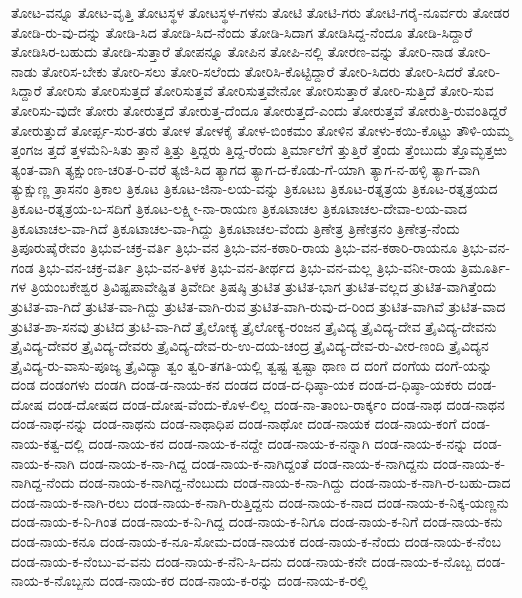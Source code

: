 ತೋಟ-ವನ್ನೂ
ತೋಟ-ವೃತ್ತಿ
ತೋಟಸ್ಥಳ
ತೋಟಸ್ಥಳ-ಗಳನು
ತೋಟಿ
ತೋಟಿ-ಗರು
ತೋಟಿ-ಗರೈ-ನೂರ್ವರು
ತೋಡರ
ತೋಡಿ-ರು-ವು-ದನ್ನು
ತೋಡಿ-ಸಿದ
ತೋಡಿ-ಸಿದ-ನೆಂದು
ತೋಡಿ-ಸಿದಾಗ
ತೋಡಿಸಿದ್ದ-ನೆಂದೂ
ತೋಡಿ-ಸಿದ್ದಾರೆ
ತೋಡಿಸಿರ-ಬಹುದು
ತೋಡಿ-ಸುತ್ತಾರೆ
ತೋಪನ್ನೂ
ತೋಪಿನ
ತೋಪಿ-ನಲ್ಲಿ
ತೋರಣ-ವನ್ನು
ತೋರಿ-ನಾಡ
ತೋರಿ-ನಾಡು
ತೋರಿಸ-ಬೇಕು
ತೋರಿ-ಸಲು
ತೋರಿ-ಸಲೆಂದು
ತೋರಿಸಿ-ಕೊಟ್ಟಿದ್ದಾರೆ
ತೋರಿ-ಸಿದರು
ತೋರಿ-ಸಿದರೆ
ತೋರಿ-ಸಿದ್ದಾರೆ
ತೋರಿಸು
ತೋರಿಸುತ್ತದೆ
ತೋರಿಸುತ್ತವೆ
ತೋರಿಸುತ್ತವೇನೋ
ತೋರಿಸುತ್ತಾರೆ
ತೋರಿ-ಸುತ್ತಿದೆ
ತೋರಿ-ಸುವ
ತೋರಿಸು-ವುದೇ
ತೋರು
ತೋರುತ್ತದೆ
ತೋರುತ್ತ-ದೆಂದೂ
ತೋರುತ್ತದೆ-ಎಂದು
ತೋರುತ್ತವೆ
ತೋರುತ್ತಿ-ರುವಂತಿದ್ದರೆ
ತೋರುತ್ತುದೆ
ತೋರ್ಪ್ಪ-ಸುರ-ತರು
ತೋಳ
ತೋಳಕೈ
ತೋಳ-ಬಿಂಕಮಂ
ತೋಳಿನ
ತೋಳು-ಕಯಿ-ಕೊಟ್ಟು
ತೌಳಿ-ಯಮ್ಮ
ತ್ತಂಗಜ
ತ್ತದೆ
ತ್ತಳಮೆನಿ-ಸಿತು
ತ್ತಾನೆ
ತ್ತಿತ್ತು
ತ್ತಿದ್ದರು
ತ್ತಿದ್ದ-ರೆಂದು
ತ್ತಿರ್ಮಾಲೆಗೆ
ತ್ತುತ್ತಿರೆ
ತ್ತೆಂದು
ತ್ತೆಂಬುದು
ತ್ತೊಮ್ಭತ್ತಱು
ತ್ಯಂತ-ವಾಗಿ
ತ್ಯಕ್ಷುಂಣ-ಚರಿತ-ರಿ-ವರೆ
ತ್ಯಜಿ-ಸಿದ
ತ್ಯಾಗದ
ತ್ಯಾಗ-ದ-ಕೊಡು-ಗೆ-ಯಾಗಿ
ತ್ಯಾಗ-ನ-ಹಳ್ಳಿ
ತ್ಯಾಗ-ವಾಗಿ
ತ್ಯುಕ್ಷುಣ್ಣ
ತ್ರಾಸನಂ
ತ್ರಿಕಾಲ
ತ್ರಿಕೂಟ
ತ್ರಿಕೂಟ-ಜಿನಾ-ಲಯ-ವನ್ನು
ತ್ರಿಕೂಟಬ
ತ್ರಿಕೂಟ-ರತ್ನತ್ರಯ
ತ್ರಿಕೂಟ-ರತ್ನತ್ರಯದ
ತ್ರಿಕೂಟ-ರತ್ನತ್ರಯ-ಬ-ಸದಿಗೆ
ತ್ರಿಕೂಟ-ಲಕ್ಷ್ಮೀ-ನಾ-ರಾಯಣ
ತ್ರಿಕೂಟಾಚಲ
ತ್ರಿಕೂಟಾಚಲ-ದೇವಾ-ಲಯ-ವಾದ
ತ್ರಿಕೂಟಾಚಲ-ವಾ-ಗಿದೆ
ತ್ರಿಕೂಟಾಚಲ-ವಾ-ಗಿದ್ದು
ತ್ರಿಕೂಟಾಚಲ-ವೆಂದು
ತ್ರಿಣೇತ್ರ
ತ್ರಿಣೇತ್ರನಂ
ತ್ರಿಣೇತ್ರ-ನೆಂದು
ತ್ರಿಪೂರುಷೈರೇವಂ
ತ್ರಿಭುವ-ಚಕ್ರ-ವರ್ತಿ
ತ್ರಿಭು-ವನ
ತ್ರಿಭು-ವನ-ಕಠಾರಿ-ರಾಯ
ತ್ರಿಭು-ವನ-ಕಠಾರಿ-ರಾಯನೂ
ತ್ರಿಭು-ವನ-ಗಂಡ
ತ್ರಿಭು-ವನ-ಚಕ್ರ-ವರ್ತಿ
ತ್ರಿಭು-ವನ-ತಿಳಕ
ತ್ರಿಭು-ವನ-ತೀರ್ಥದ
ತ್ರಿಭು-ವನ-ಮಲ್ಲ
ತ್ರಿಭು-ವನೀ-ರಾಯ
ತ್ರಿಮೂರ್ತಿ-ಗಳ
ತ್ರಿಯಂಬಕೇಶ್ವರ
ತ್ರಿವಿಷ್ಟಪಾವೇಷ್ಟಿತ
ತ್ರಿವೇದೀ
ತ್ರಿಷಷ್ಠಿ
ತ್ರುಟಿತ
ತ್ರುಟಿತ-ಭಾಗ
ತ್ರುಟಿತ-ವಲ್ಲದ
ತ್ರುಟಿತ-ವಾಗಿತ್ತೆಂದು
ತ್ರುಟಿತ-ವಾ-ಗಿದೆ
ತ್ರುಟಿತ-ವಾ-ಗಿದ್ದು
ತ್ರುಟಿತ-ವಾಗಿ-ರುವ
ತ್ರುಟಿತ-ವಾಗಿ-ರುವು-ದ-ರಿಂದ
ತ್ರುಟಿತ-ವಾಗಿವೆ
ತ್ರುಟಿತ-ವಾದ
ತ್ರುಟಿತ-ಶಾ-ಸನವು
ತ್ರುಟಿದ
ತ್ರುಟಿ-ವಾ-ಗಿದೆ
ತ್ರೈಲೋಕ್ಯ
ತ್ರೈಲೋಕ್ಯ-ರಂಜನ
ತ್ರೈವಿದ್ಯ
ತ್ರೈವಿದ್ಯ-ದೇವ
ತ್ರೈವಿದ್ಯ-ದೇವನು
ತ್ರೈವಿದ್ಯ-ದೇವರ
ತ್ರೈವಿದ್ಯ-ದೇವರು
ತ್ರೈವಿದ್ಯ-ದೇವ-ರು-ಉ-ದಯ-ಚಂದ್ರ
ತ್ರೈವಿದ್ಯ-ದೇವ-ರು-ವೀರ-ಣಂದಿ
ತ್ರೈವಿದ್ಯನ
ತ್ರೈವಿದ್ಯ-ರು-ವಾಸು-ಪೂಜ್ಯ
ತ್ರೈವಿದ್ಯಾ
ತ್ವಂ
ತ್ವರಿ-ತಗತಿ-ಯಲ್ಲಿ
ತ್ವಷ್ಟ
ತ್ವಷ್ಟಾ
ಥಾಣ
ದ
ದಂಗೆ
ದಂಗೆಯ
ದಂಗೆ-ಯನ್ನು
ದಂಡ
ದಂಡಂಗಳು
ದಂಡಗಿ
ದಂಡ-ಡ-ನಾಯ-ಕನ
ದಂಡದ
ದಂಡ-ದ-ಧಿಷ್ಠಾ-ಯಕ
ದಂಡ-ದ-ಧಿಷ್ಠಾ-ಯಕರು
ದಂಡ-ದೋಷ
ದಂಡ-ದೋಷದ
ದಂಡ-ದೋಷ-ವೆಂದು-ಕೊಳ-ಲಿಲ್ಲ
ದಂಡ-ನಾ-ತಾಂಬ-ರಾರ್ಕ್ಕಂ
ದಂಡ-ನಾಥ
ದಂಡ-ನಾಥನ
ದಂಡ-ನಾಥ-ನನ್ನು
ದಂಡ-ನಾಥನು
ದಂಡ-ನಾಥಾಧಿಪ
ದಂಡ-ನಾಥೋ
ದಂಡ-ನಾಯಕ
ದಂಡ-ನಾಯ-ಕಂಗೆ
ದಂಡ-ನಾಯ-ಕತ್ವ-ದಲ್ಲಿ
ದಂಡ-ನಾಯ-ಕನ
ದಂಡ-ನಾಯ-ಕ-ನದ್ದೇ
ದಂಡ-ನಾಯ-ಕ-ನನ್ನಾಗಿ
ದಂಡ-ನಾಯ-ಕ-ನನ್ನು
ದಂಡ-ನಾಯ-ಕ-ನಾಗಿ
ದಂಡ-ನಾಯ-ಕ-ನಾ-ಗಿದ್ದ
ದಂಡ-ನಾಯ-ಕ-ನಾಗಿದ್ದಂತೆ
ದಂಡ-ನಾಯ-ಕ-ನಾಗಿದ್ದನು
ದಂಡ-ನಾಯ-ಕ-ನಾಗಿದ್ದ-ನೆಂದು
ದಂಡ-ನಾಯ-ಕ-ನಾಗಿದ್ದ-ನೆಂಬುದು
ದಂಡ-ನಾಯ-ಕ-ನಾ-ಗಿದ್ದು
ದಂಡ-ನಾಯ-ಕ-ನಾಗಿ-ರ-ಬಹು-ದಾದ
ದಂಡ-ನಾಯ-ಕ-ನಾಗಿ-ರಲು
ದಂಡ-ನಾಯ-ಕ-ನಾಗಿ-ರುತ್ತಿದ್ದನು
ದಂಡ-ನಾಯ-ಕ-ನಾದ
ದಂಡ-ನಾಯ-ಕ-ನಿಕ್ಕ-ಯಣ್ಣನು
ದಂಡ-ನಾಯ-ಕ-ನಿ-ಗಿಂತ
ದಂಡ-ನಾಯ-ಕ-ನಿ-ಗಿದ್ದ
ದಂಡ-ನಾಯ-ಕ-ನಿಗೂ
ದಂಡ-ನಾಯ-ಕ-ನಿಗೆ
ದಂಡ-ನಾಯ-ಕನು
ದಂಡ-ನಾಯ-ಕನೂ
ದಂಡ-ನಾಯ-ಕ-ನೂ-ಸೋಮ-ದಂಡ-ನಾಯಕ
ದಂಡ-ನಾಯ-ಕ-ನೆಂದು
ದಂಡ-ನಾಯ-ಕ-ನೆಂಬ
ದಂಡ-ನಾಯ-ಕ-ನೆಂಬು-ವ-ವನು
ದಂಡ-ನಾಯ-ಕ-ನೆನಿ-ಸಿ-ದನು
ದಂಡ-ನಾಯ-ಕನೇ
ದಂಡ-ನಾಯ-ಕ-ನೊಬ್ಬ
ದಂಡ-ನಾಯ-ಕ-ನೊಬ್ಬನು
ದಂಡ-ನಾಯ-ಕರ
ದಂಡ-ನಾಯ-ಕ-ರನ್ನು
ದಂಡ-ನಾಯ-ಕ-ರಲ್ಲಿ
